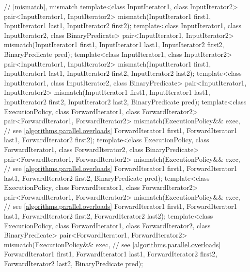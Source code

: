 \begin{codeblock}
{  // \ref{mismatch}, mismatch
  template<class InputIterator1, class InputIterator2>
    pair<InputIterator1, InputIterator2>
      mismatch(InputIterator1 first1, InputIterator1 last1,
               InputIterator2 first2);
  template<class InputIterator1, class InputIterator2, class BinaryPredicate>
    pair<InputIterator1, InputIterator2>
      mismatch(InputIterator1 first1, InputIterator1 last1,
               InputIterator2 first2, BinaryPredicate pred);
  template<class InputIterator1, class InputIterator2>
    pair<InputIterator1, InputIterator2>
      mismatch(InputIterator1 first1, InputIterator1 last1,
               InputIterator2 first2, InputIterator2 last2);
  template<class InputIterator1, class InputIterator2, class BinaryPredicate>
    pair<InputIterator1, InputIterator2>
      mismatch(InputIterator1 first1, InputIterator1 last1,
               InputIterator2 first2, InputIterator2 last2,
               BinaryPredicate pred);
  template<class ExecutionPolicy, class ForwardIterator1, class ForwardIterator2>
    pair<ForwardIterator1, ForwardIterator2>
      mismatch(ExecutionPolicy&& exec, // see \ref{algorithms.parallel.overloads}
               ForwardIterator1 first1, ForwardIterator1 last1,
               ForwardIterator2 first2);
  template<class ExecutionPolicy, class ForwardIterator1, class ForwardIterator2,
           class BinaryPredicate>
    pair<ForwardIterator1, ForwardIterator2>
      mismatch(ExecutionPolicy&& exec, // see \ref{algorithms.parallel.overloads}
               ForwardIterator1 first1, ForwardIterator1 last1,
               ForwardIterator2 first2, BinaryPredicate pred);
  template<class ExecutionPolicy, class ForwardIterator1, class ForwardIterator2>
    pair<ForwardIterator1, ForwardIterator2>
      mismatch(ExecutionPolicy&& exec, // see \ref{algorithms.parallel.overloads}
               ForwardIterator1 first1, ForwardIterator1 last1,
               ForwardIterator2 first2, ForwardIterator2 last2);
  template<class ExecutionPolicy, class ForwardIterator1, class ForwardIterator2,
           class BinaryPredicate>
    pair<ForwardIterator1, ForwardIterator2>
      mismatch(ExecutionPolicy&& exec, // see \ref{algorithms.parallel.overloads}
               ForwardIterator1 first1, ForwardIterator1 last1,
               ForwardIterator2 first2, ForwardIterator2 last2,
               BinaryPredicate pred);

}
\end{codeblock}

